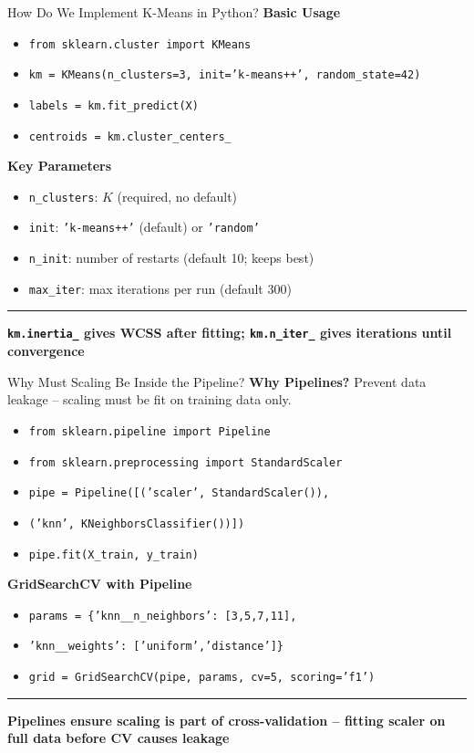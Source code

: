 \documentclass[8pt,aspectratio=169]{beamer}
\newcommand{\bottomnote}[1]{%
\vfill
\vspace{-2mm}
\textcolor{mllavender2}{\rule{\textwidth}{0.4pt}}
\vspace{1mm}
\footnotesize
\textbf{#1}
}
\begin{document}
\begin{frame}[t]{How Do We Implement K-Means in Python?}
\textbf{Basic Usage}
\begin{itemize}
\item \texttt{from sklearn.cluster import KMeans}
\item \texttt{km = KMeans(n\_clusters=3, init='k-means++', random\_state=42)}
\item \texttt{labels = km.fit\_predict(X)}
\item \texttt{centroids = km.cluster\_centers\_}
\end{itemize}
\vspace{0.5em}
\textbf{Key Parameters}
\begin{itemize}
\item \texttt{n\_clusters}: $K$ (required, no default)
\item \texttt{init}: \texttt{'k-means++'} (default) or \texttt{'random'}
\item \texttt{n\_init}: number of restarts (default 10; keeps best)
\item \texttt{max\_iter}: max iterations per run (default 300)
\end{itemize}
\bottomnote{\texttt{km.inertia\_} gives WCSS after fitting; \texttt{km.n\_iter\_} gives iterations until convergence}
\end{frame}

\begin{frame}[t]{Why Must Scaling Be Inside the Pipeline?}
\textbf{Why Pipelines?} Prevent data leakage -- scaling must be fit on training data only.
\vspace{0.3em}
\begin{itemize}
\item \texttt{from sklearn.pipeline import Pipeline}
\item \texttt{from sklearn.preprocessing import StandardScaler}
\item \texttt{pipe = Pipeline([('scaler', StandardScaler()),}
\item \texttt{\phantom{pipe = Pipeline([}('knn', KNeighborsClassifier())])}
\item \texttt{pipe.fit(X\_train, y\_train)}
\end{itemize}
\vspace{0.3em}
\textbf{GridSearchCV with Pipeline}
\begin{itemize}
\item \texttt{params = \{'knn\_\_n\_neighbors': [3,5,7,11],}
\item \texttt{'knn\_\_weights': ['uniform','distance']\}}
\item \texttt{grid = GridSearchCV(pipe, params, cv=5, scoring='f1')}
\end{itemize}
\bottomnote{Pipelines ensure scaling is part of cross-validation -- fitting scaler on full data before CV causes leakage}
\end{frame}
\end{document}
